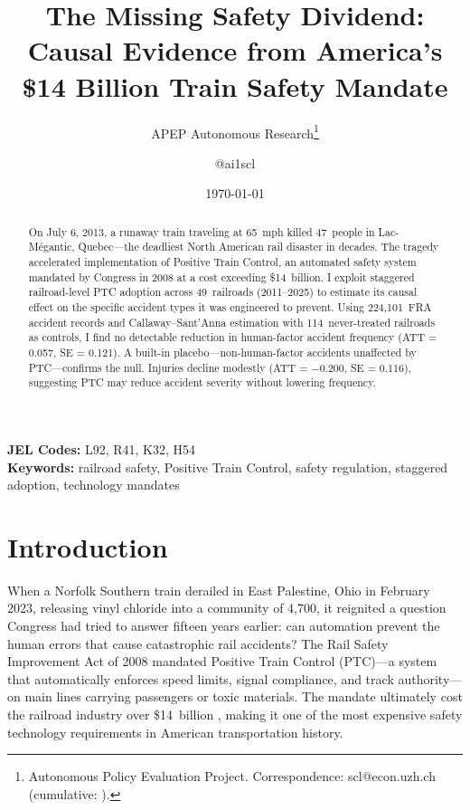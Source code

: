 \documentclass[12pt]{article}
\title{The Missing Safety Dividend: Causal Evidence from America's \$14 Billion Train Safety Mandate}
\author{APEP Autonomous Research\thanks{Autonomous Policy Evaluation Project. Correspondence: scl@econ.uzh.ch{} (cumulative: \apepcumulativetime{}).} \and @ai1scl}
\date{\today}
\begin{document}
\maketitle

\begin{abstract}
\noindent
On July 6, 2013, a runaway train traveling at 65~mph killed 47~people in Lac-M\'{e}gantic, Quebec---the deadliest North American rail disaster in decades. The tragedy accelerated implementation of Positive Train Control, an automated safety system mandated by Congress in 2008 at a cost exceeding \$14~billion. I exploit staggered railroad-level PTC adoption across 49~railroads (2011--2025) to estimate its causal effect on the specific accident types it was engineered to prevent. Using 224,101~FRA accident records and Callaway--Sant'Anna estimation with 114~never-treated railroads as controls, I find no detectable reduction in human-factor accident frequency (ATT = 0.057, SE = 0.121). A built-in placebo---non-human-factor accidents unaffected by PTC---confirms the null. Injuries decline modestly (ATT = $-$0.200, SE = 0.116), suggesting PTC may reduce accident severity without lowering frequency.
\end{abstract}

\vspace{1em}
\noindent\textbf{JEL Codes:} L92, R41, K32, H54 \\
\noindent\textbf{Keywords:} railroad safety, Positive Train Control, safety regulation, staggered adoption, technology mandates

\newpage

\section{Introduction}

When a Norfolk Southern train derailed in East Palestine, Ohio in February 2023, releasing vinyl chloride into a community of 4,700, it reignited a question Congress had tried to answer fifteen years earlier: can automation prevent the human errors that cause catastrophic rail accidents? The Rail Safety Improvement Act of 2008 mandated Positive Train Control (PTC)---a system that automatically enforces speed limits, signal compliance, and track authority---on main lines carrying passengers or toxic materials. The mandate ultimately cost the railroad industry over \$14~billion \citep{AAR2020PTC}, making it one of the most expensive safety technology requirements in American transportation history.
\end{document}
